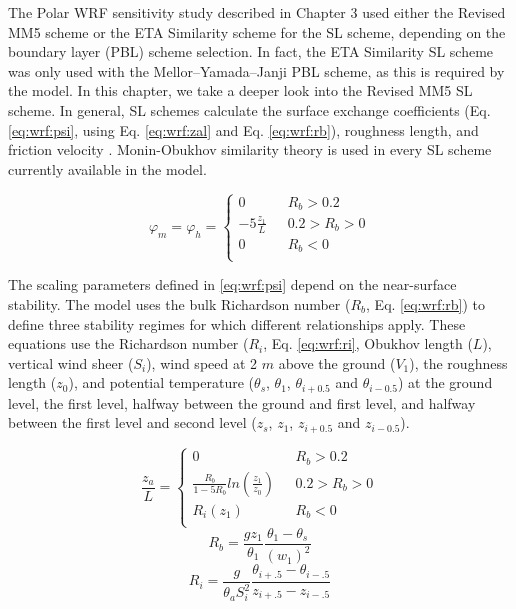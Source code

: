 The Polar WRF sensitivity study described in Chapter 3 used either the Revised MM5 scheme \citep{paulson:1970, dyer:1970, webb:1970, beljaars:1994} or the ETA Similarity scheme for the SL scheme, depending on the boundary layer (PBL) scheme selection. In fact, the ETA Similarity SL scheme was only used with the Mellor–Yamada–Janji PBL scheme, as this is required by the model. In this chapter, we take a deeper look into the Revised MM5 SL scheme. In general, SL schemes calculate the surface exchange coefficients (Eq. \ref{eq:wrf:psi}, using Eq. \ref{eq:wrf:zal} and Eq. \ref{eq:wrf:rb}), roughness length, and friction velocity \citep{dudhia:2014}. Monin-Obukhov similarity theory is used in every SL scheme currently available in the model. 

\begin{equation}\label{eq:wrf:psi}
\varphi_{m} = 
\varphi_{h} = \begin{cases} 
0 & \text{    } R_{b} > 0.2 \\ 
-5 \frac{z_{1}}{L} & \text{    } 0.2 > R_{b} > 0 \\ 
0 & \text{    } R_{b} < 0 \\ 
\end{cases}
\end{equation}

The scaling parameters defined in \ref{eq:wrf:psi} depend on the near-surface stability. The model uses the bulk Richardson number ($R_{b}$, Eq. \ref{eq:wrf:rb}) to define three stability regimes for which different relationships apply. These equations use the Richardson number ($R_{i}$, Eq. \ref{eq:wrf:ri}, Obukhov length ($L$), vertical wind sheer ($S_{i}$), wind speed at 2 $m$ above the ground ($V_{1}$), the roughness length ($z_{0}$), and potential temperature ($\theta_{s}$, $\theta_{1}$, $\theta_{i+0.5}$ and $\theta_{i-0.5}$) at the ground level, the first level, halfway between the ground and first level, and halfway between the first level and second level ($z_{s}$, $z_{1}$, $z_{i+0.5}$ and $z_{i-0.5}$). 

\begin{equation}\label{eq:wrf:zal}
\frac{z_{a}}{L} = \begin{cases} 
0 & \text{    } R_{b} > 0.2 \\ 
\frac{R_{b}}{1-5R_{b}}ln(\frac{z_{1}}{z_{0}}) & \text{    } 0.2 > R_{b} > 0 \\ 
R_{i} ( z_{1} ) & \text{    }R_{b} < 0  \\ 
\end{cases}
\end{equation}
\begin{equation}\label{eq:wrf:rb}
R_{b} = \frac{gz_{1}}{\theta_{1}}\frac{\theta_{1} - \theta_{s}}{(w_{1})^{2}}
\end{equation}
\begin{equation}\label{eq:wrf:ri}
R_{i} = \frac{g}{\theta_{a}S_{i}^{2}} \frac{\theta_{i+.5} - \theta_{i-.5}}{z_{i+.5} - z_{i-.5}}
\end{equation}

